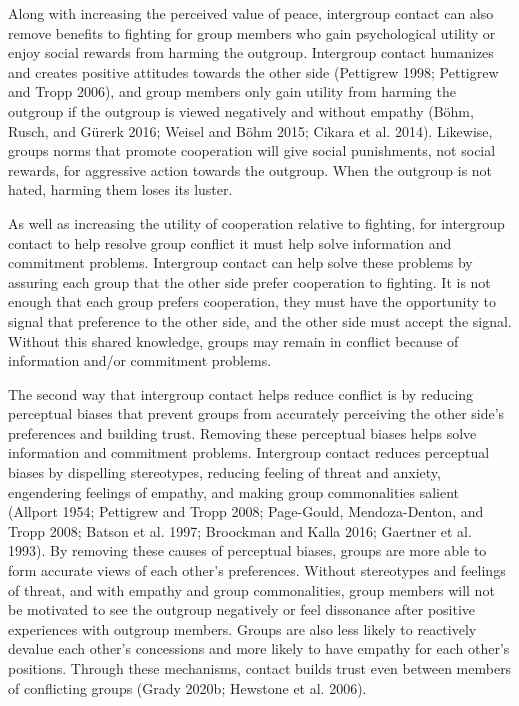 \documentclass[11pt]{article}
\begin{document}
Along with increasing the perceived value of peace, intergroup contact
can also remove benefits to fighting for group members who gain
psychological utility or enjoy social rewards from harming the outgroup.
Intergroup contact humanizes and creates positive attitudes towards the
other side (Pettigrew 1998; Pettigrew and Tropp 2006), and group members
only gain utility from harming the outgroup if the outgroup is viewed
negatively and without empathy (Böhm, Rusch, and Gürerk 2016; Weisel and
Böhm 2015; Cikara et al. 2014). Likewise, groups norms that promote
cooperation will give social punishments, not social rewards, for
aggressive action towards the outgroup. When the outgroup is not hated,
harming them loses its luster.

As well as increasing the utility of cooperation relative to fighting,
for intergroup contact to help resolve group conflict it must help solve
information and commitment problems. Intergroup contact can help solve
these problems by assuring each group that the other side prefer
cooperation to fighting. It is not enough that each group prefers
cooperation, they must have the opportunity to signal that preference to
the other side, and the other side must accept the signal. Without this
shared knowledge, groups may remain in conflict because of information
and/or commitment problems.

The second way that intergroup contact helps reduce conflict is by
reducing perceptual biases that prevent groups from accurately
perceiving the other side's preferences and building trust. Removing
these perceptual biases helps solve information and commitment problems.
Intergroup contact reduces perceptual biases by dispelling stereotypes,
reducing feeling of threat and anxiety, engendering feelings of empathy,
and making group commonalities salient (Allport 1954; Pettigrew and
Tropp 2008; Page-Gould, Mendoza-Denton, and Tropp 2008; Batson et al.
1997; Broockman and Kalla 2016; Gaertner et al. 1993). By removing these
causes of perceptual biases, groups are more able to form accurate views
of each other's preferences. Without stereotypes and feelings of threat,
and with empathy and group commonalities, group members will not be
motivated to see the outgroup negatively or feel dissonance after
positive experiences with outgroup members. Groups are also less likely
to reactively devalue each other's concessions and more likely to have
empathy for each other's positions. Through these mechanisms, contact
builds trust even between members of conflicting groups (Grady 2020b;
Hewstone et al. 2006).
\end{document}
